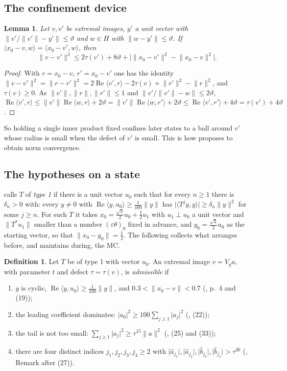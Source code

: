 \documentclass[11pt]{article}
\newtheorem{lemma}[theorem]{Lemma}
\theoremstyle{definition}
\newtheorem{definition}[theorem]{Definition}
\newcommand{\ip}[2]{\langle #1,#2\rangle}
\newcommand{\norm}[1]{\lVert #1\rVert}
\newcommand{\abs}[1]{\lvert #1\rvert}
\newcommand{\re}{\operatorname{Re}}
\newcommand{\ha}{\hat a}
\newcommand{\hb}{\hat b}
\begin{document}
\subsection*{The confinement device}

\begin{lemma}\label{lem:confine}
Let $v,v'$ be extremal images, $y'$ a unit vector with
$\norm{v'/\norm{v'}-y'}\le\vartheta$ and $w\in H$ with $\norm{w-y'}\le\vartheta$. If
$\ip{x_0-v}{w}=\ip{x_0-v'}{w}$, then
\[
\norm{v-v'}^2\le2\tau(v')+8\vartheta+\bigl|\norm{x_0-v'}^2-\norm{x_0-v}^2\bigr| .
\]
\end{lemma}
\begin{proof}
With $r=x_0-v$, $r'=x_0-v'$ one has the identity
$\norm{v-v'}^2=\norm{r-r'}^2=2\re\ip{v'}{r}-2\tau(v)+\norm{r'}^2-\norm r^2$, and
$\tau(v)\ge0$. As $\norm{v'},\norm r,\norm{r'}\le1$ and $\norm{v'/\norm{v'}-w}\le2\vartheta$,
$\re\ip{v'}{r}\le\norm{v'}\re\ip wr+2\vartheta=\norm{v'}\re\ip w{r'}+2\vartheta
\le\re\ip{v'}{r'}+4\vartheta=\tau(v')+4\vartheta$.
\end{proof}

So holding a single inner product fixed confines later states to a ball around $v'$ whose
radius is small when the defect of $v'$ is small. This is how \cite{E} proposes to obtain
norm convergence.

\subsection*{The hypotheses on a state}
\cite{E} calls $T$ of \emph{type 1} if there is a unit vector $u_0$ such that for every
$n\ge1$ there is $\delta_n>0$ with: every $y\ne0$ with
$\re\ip{y}{u_0}\ge\frac1{100}\norm y$ has $\abs{\ip{T^jy}{y}}\ge\delta_n\norm y^2$ for some
$j\ge n$. For such $T$ it takes $x_0=\frac{\sqrt3}2u_0+\frac12u_1$ with $u_1\perp u_0$ a unit
vector and $\norm{T^*u_1}$ smaller than a number $(\varepsilon\theta)_0$ fixed in advance, and
$y_0=\frac{\sqrt3}2u_0$ as the starting vector, so that $\norm{x_0-y_0}=\frac12$. The following
collects what \cite{E} arranges before, and maintains during, the MC.

\begin{definition}\label{def:admissible}
Let $T$ be of type 1 with vector $u_0$. An extremal image $v=V_ya$, with parameter $t$ and
defect $\tau=\tau(v)$, is \emph{admissible} if
\begin{enumerate}[label=\textup{(A\arabic*)},leftmargin=3em]
\item $y$ is cyclic, $\re\ip y{u_0}\ge\frac1{100}\norm y$, and $0.3<\norm{x_0-v}<0.7$
\textup{(\cite{E}, p.~4 and (19))};
\item the leading coefficient dominates: $\abs{a_0}^2\ge100\sum_{j\ge1}\abs{a_j}^2$
\textup{(\cite{E}, (22))};
\item the tail is not too small: $\sum_{j\ge1}\abs{a_j}^2\ge\tau^{15}\norm a^2$
\textup{(\cite{E}, (25) and (33))};
\item there are four distinct indices $j_1,j_2,j_3,j_4\ge2$ with
$\abs{\ha_{j_1}},\abs{\ha_{j_2}},\abs{\hb_{j_3}},\abs{\hb_{j_4}}>\tau^{30}$
\textup{(\cite{E}, Remark after (27))}.
\end{enumerate}
\end{definition}
\end{document}

